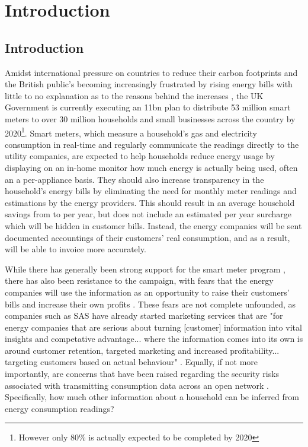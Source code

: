 \chapter{Introduction}
\section{Introduction}
Amidst international pressure on countries to reduce their carbon footprints \cite{E_spending} and the British public's becoming increasingly frustrated by rising energy bills with little to no explanation as to the reasons behind the increases \cite{E_spending}, the UK Government is currently executing an \textsterling 11bn plan to distribute 53 million smart meters to over 30 million households and small businesses across the country by 2020\footnote{However only 80\% is actually expected to be completed by 2020}. Smart meters, which measure a household's gas and electricity consumption in real-time and regularly communicate the readings directly to the utility companies, are expected to help households reduce energy usage by displaying on an in-home monitor how much energy is actually being used, often an a per-appliance basis. They should also increase transparency in the household's energy bills by eliminating the need for monthly meter readings and estimations by the energy providers. This should result in an average household savings from  to  per year, but does not include an estimated  per year surcharge which will be hidden in customer bills. Instead, the energy companies will be sent documented accountings of their customers' real consumption, and as a result, will be able to invoice more accurately.

While there has generally been strong support for the smart meter program \cite{DECC_1}, there has also been resistance to the campaign, with fears that the energy companies will use the information as an opportunity to raise their customers' bills and increase their own profits \cite{stop,Anderson}. These fears are not complete unfounded, as companies such as SAS have already started marketing services that are "for energy companies that are serious about turning [customer] information into vital insights and competative advantage... where the information comes into its own is around customer retention, targeted marketing and increased profitability... targeting customers based on actual behaviour" \cite{SAS}. Equally, if not more importantly, are concerns that have been raised regarding the security risks associated with transmitting consumption data across an open network \cite{Quinn,LMW}. Specifically, how much other information about a household can be inferred from energy consumption readings? 


